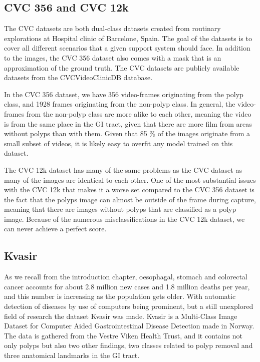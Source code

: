 \subsection{CVC 356 and CVC 12k}
The CVC datasets are both dual-class datasets created from routinary explorations at Hospital clinic of Barcelone, Spain. 
The goal of the datasets is to cover all different scenarios that a given support system should face. In addition to the images, the CVC 356 dataset also comes with a mask that is an approximation of the ground truth.
The CVC datasets are publicly available datasets from the CVCVideoClinicDB database.

In the CVC 356 dataset, we have 356 video-frames originating from the polyp class, and 1928 frames originating from the non-polyp class. 
In general, the video-frames from the non-polyp class are more alike to each other, meaning the video is from the same place in the GI tract, given that there are more film from areas without polyps than with them. 
Given that 85 \% of the images originate from a small subset of videos, it is likely easy to overfit any model trained on this dataset.


The CVC 12k dataset has many of the same problems as the CVC dataset as many of the images are identical to each other. One of the most substantial issues with the CVC 12k  that makes it a worse set compared to the CVC 356 dataset is the fact that the polyps image can almost be outside of the frame during capture, meaning that there are images without polyps that are classified as a polyp image. Because of the numerous misclassifications in the CVC 12k dataset, we can never achieve a perfect score.
 





\iffalse

\subsection{Kvasir}


As we recall from the introduction chapter, oesophagal, stomach and colorectal cancer accounts for about 2.8 million new cases and 1.8 million deaths per year, and this number is increasing as the population gets older.   With automatic detection of diseases by use of computers being prominent, but a still unexplored field of research the dataset Kvasir was made.
Kvasir is a Multi-Class Image Dataset for Computer Aided Gastrointestinal Disease Detection made in Norway. The data is gathered from the Vestre Viken Health Trust, and it contains not only polyps but also two other findings, two classes related to polyp removal and three anatomical landmarks in the GI tract.

